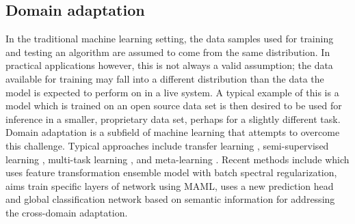 \subsection{Domain adaptation}
In the traditional machine learning setting, the data samples used for training and testing an algorithm are assumed to come from the same distribution. In practical applications however, this is not always a valid assumption; the data available for training may fall into a different distribution than the data the model is expected to perform on in a live system. A typical example of this is a model which is trained on an open source data set is then desired to be used for inference in a smaller, proprietary data set, perhaps for a slightly different task. Domain adaptation is a subfield of machine learning that attempts to overcome this challenge. Typical approaches include transfer learning \cite{Pan2010ASO}, semi-supervised learning \cite{semisupervisedSurvey,semisupervisedSurvey_2}, multi-task learning \cite{Caruana2004MultitaskL}, and meta-learning \cite{Huisman_2021}. Recent methods include 
\citep{liu2020feature} which uses feature transformation ensemble model with batch spectral regularization, \citep{cai2020cross} aims train specific layers of network using MAML,
 \citep{jiang2020transductive} uses a new prediction head and global classification network based on semantic information for addressing the cross-domain adaptation.







